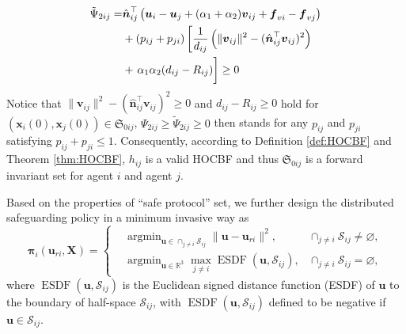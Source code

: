 \documentclass{ifacconf}
\begin{document}
\begin{pf}
\begin{equation}
   \begin{aligned}
      \tilde{\Psi}_{2ij} =& \hat{\boldsymbol{n}}_{ij}^\top \left(\boldsymbol{u}_i - \boldsymbol{u}_j + (\alpha_1 + \alpha_2)\boldsymbol{v}_{ij} + \boldsymbol{f}_{vi} - \boldsymbol{f}_{vj} \right) \\
      &+ (p_{ij} + p_{ji})\left[ \frac{1}{d_{ij}} \left( \|\boldsymbol{v}_{ij}\|^2 -  (\hat{\boldsymbol{n}}_{ij}^{\top}\boldsymbol{v}_{ij} )^2 \right) \right. \\
      &+ \left. \alpha_1 \alpha_2 (d_{ij} - R_{ij}) 
            \vphantom{ \frac{1}{d_{ij}} \left( \|\boldsymbol{v}_{ij}\|^2 -  (\hat{\boldsymbol{n}}_{ij}^{\top}\boldsymbol{v}_{ij} )^2 \right) } 
         \right] \ge 0
   \end{aligned}
\end{equation}
Notice that $\|\boldsymbol{v}_{ij}\|^2 -  (\hat{\boldsymbol{n}}_{ij}^{\top}\boldsymbol{v}_{ij} )^2  \ge 0$ and $d_{ij} - R_{ij} \ge 0$ hold for $\left( \boldsymbol{x}_i(0), \boldsymbol{x}_j(0) \right) \in \mathfrak{S}_{0ij}$, $\Psi_{2ij} \ge \tilde{\Psi}_{2ij} \ge 0$ then stands for any $p_{ij}$ and $p_{ji}$ satisfying $p_{ij} + p_{ji} \le 1$.
Consequently, according to Definition \ref{def:HOCBF} and Theorem \ref{thm:HOCBF}, $h_{ij}$ is a valid HOCBF and thus $\mathfrak{S}_{0ij}$ is a forward invariant set for agent $i$ and agent $j$.
\end{pf}

Based on the properties of ``safe protocol'' set, we further design the distributed safeguarding policy in a minimum invasive way as
\begin{equation}\label{eqn:strategy}
   \boldsymbol{\pi}_i(\boldsymbol{u}_{ri}, \boldsymbol{X}) = 
   \left\{
   \begin{aligned}
      &\mathop{\arg \min}_{\boldsymbol{u} \in \cap_{j \neq i} \mathcal{S}_{ij}} \| \boldsymbol{u} - \boldsymbol{u}_{ri} \|^2,    &\cap_{j \neq i} \mathcal{S}_{ij} \neq \varnothing, \\
      &\mathop{\arg \min}_{\boldsymbol{u} \in \mathbb{R}^3 }\mathop{\max}_{j \neq i} \mathop{\mathrm{ESDF}}(\boldsymbol{u}, \mathcal{S}_{ij}),     &\cap_{j \neq i} \mathcal{S}_{ij} = \varnothing,
   \end{aligned}
   \right.
\end{equation}
where $\mathop{\mathrm{ESDF}}(\boldsymbol{u}, \mathcal{S}_{ij})$ is the Euclidean signed distance function (ESDF) of $\boldsymbol{u}$ to the boundary of half-space $\mathcal{S}_{ij}$, with $\mathop{\mathrm{ESDF}}(\boldsymbol{u}, \mathcal{S}_{ij})$ defined to be negative if $\boldsymbol{u} \in \mathcal{S}_{ij}$.
\end{document}
